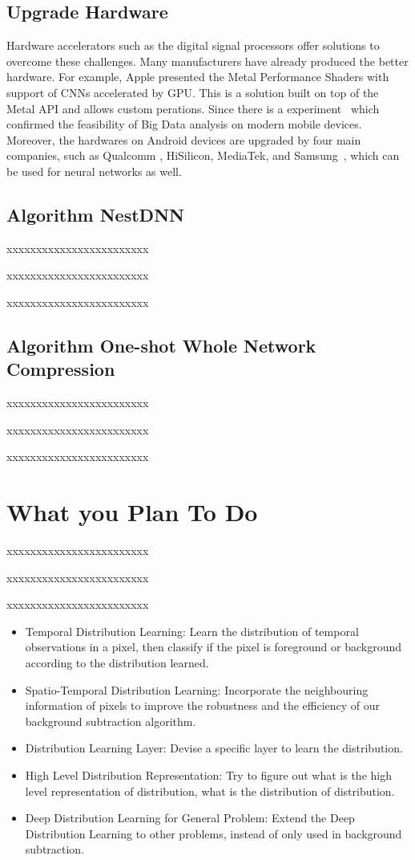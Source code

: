\documentclass[UTF8]{article}
\begin{document}
\subsection{Upgrade Hardware}\label{upgrade_hardware}
Hardware accelerators such as the digital signal processors offer solutions to overcome these challenges. Many manufacturers have already produced the better hardware. For example, Apple presented the Metal Performance Shaders with support of CNNs accelerated by GPU. This is a solution built on top of the Metal API and allows custom perations. Since there is a experiment~\cite{akusok2019metal} which confirmed the feasibility of Big Data analysis on modern mobile devices. Moreover, the hardwares on Android devices are upgraded by four main companies, such as Qualcomm , HiSilicon, MediaTek, and Samsung~\cite{Andrey2019Aibenchmark}, which can be used for neural networks as well.

\subsection{Algorithm NestDNN}\label{nestdnn}
xxxxxxxxxxxxxxxxxxxxxxxx

xxxxxxxxxxxxxxxxxxxxxxxx

xxxxxxxxxxxxxxxxxxxxxxxx

\subsection{Algorithm One-shot Whole Network Compression}\label{oneshot}
xxxxxxxxxxxxxxxxxxxxxxxx

xxxxxxxxxxxxxxxxxxxxxxxx

xxxxxxxxxxxxxxxxxxxxxxxx


\section*{What you Plan To Do}
xxxxxxxxxxxxxxxxxxxxxxxx

xxxxxxxxxxxxxxxxxxxxxxxx

xxxxxxxxxxxxxxxxxxxxxxxx

\begin{itemize}
	\item Temporal Distribution Learning:
	Learn the distribution of temporal observations in a pixel, then classify if the pixel is foreground or background according to the distribution learned.
	\item Spatio-Temporal Distribution Learning:
	Incorporate the neighbouring information of pixels to improve the robustness and the efficiency of our background subtraction algorithm.
	\item Distribution Learning Layer:
	Devise a specific layer to learn the distribution.
	\item High Level Distribution Representation:
	Try to figure out what is the high level representation of distribution, what is the distribution of distribution.
	\item Deep Distribution Learning for General Problem:
	Extend the Deep Distribution Learning to other problems, instead of only used in background subtraction.
\end{itemize}
\end{document}
